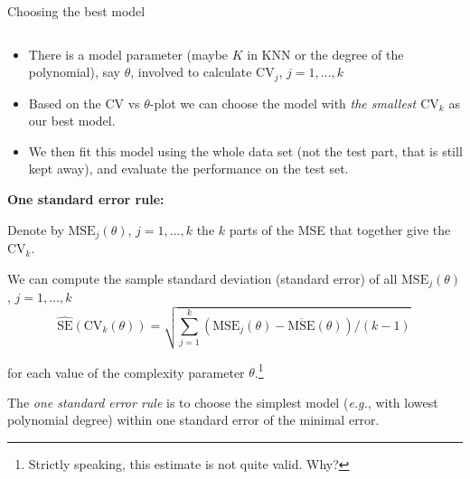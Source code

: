 \documentclass[10pt,ignorenonframetext,]{beamer}
\providecommand{\tightlist}{%
  \setlength{\itemsep}{0pt}\setlength{\parskip}{0pt}}
\begin{document}
\begin{frame}

\begin{block}{Choosing the best model}

\(~\)

\begin{itemize}
\tightlist
\item
  There is a model parameter (maybe \(K\) in KNN or the degree of the
  polynomial), say \(\theta\), involved to calculate \(\text{CV}_j\),
  \(j=1,\ldots, k\)
\end{itemize}

\vspace{2mm}

\begin{itemize}
\tightlist
\item
  Based on the CV vs \(\theta\)-plot we can choose the model with
  \emph{the smallest \({\text{CV}_k}\)} as our best model.
\end{itemize}

\vspace{2mm}

\begin{itemize}
\tightlist
\item
  We then fit this model using the whole data set (not the test part,
  that is still kept away), and evaluate the performance on the test
  set.
\end{itemize}

\end{block}

\end{frame}

\begin{frame}

\textbf{One standard error rule:}

Denote by \(\text{MSE}_j(\theta)\), \(j=1,\ldots, k\) the \(k\) parts of
the MSE that together give the \(\text{CV}_k\).

We can compute the sample standard deviation (standard error) of all
\(\text{MSE}_j(\theta)\), \(j=1,\ldots, k\)
\[\hat{\text{SE}}(\text{CV}_k(\theta))= \sqrt{\sum_{j=1}^k (\text{MSE}_j(\theta) - \overline{\text{MSE}}(\theta))/(k-1)} \, \]

for each value of the complexity parameter
\(\theta\).\footnote{Strictly speaking, this estimate is not quite valid. Why?}

The \emph{one standard error rule} is to choose the simplest model
(\emph{e.g.}, with lowest polynomial degree) within one standard error
of the minimal error.

\end{frame}
\end{document}
